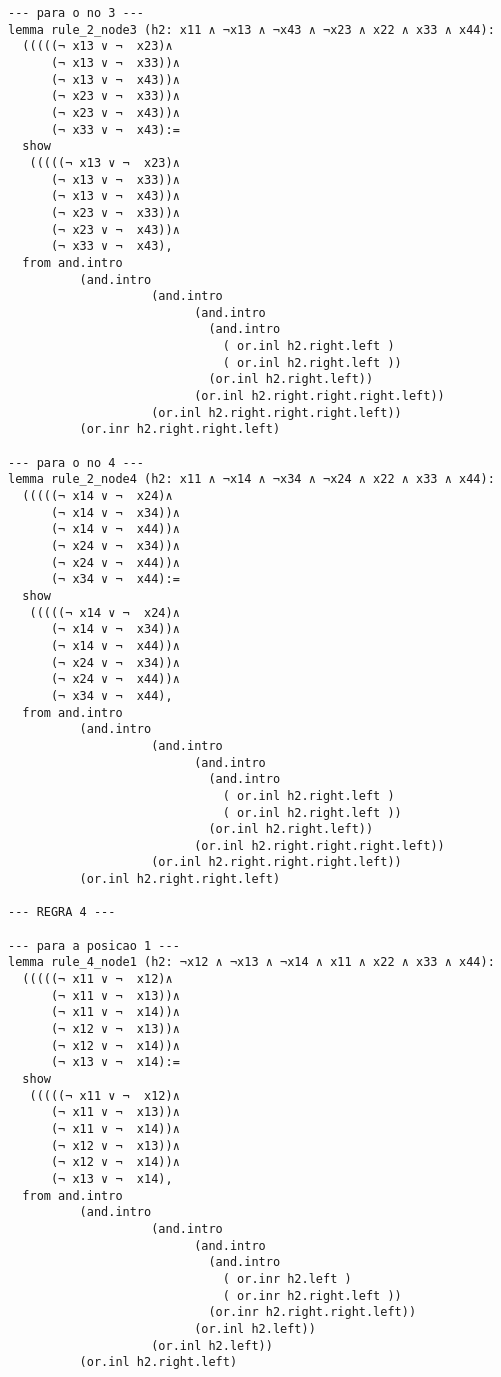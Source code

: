 \begin{enumerate}
\begin{lstlisting}
--- para o no 3 ---
lemma rule_2_node3 (h2: x11 ∧ ¬x13 ∧ ¬x43 ∧ ¬x23 ∧ x22 ∧ x33 ∧ x44):
  (((((¬ x13 ∨ ¬  x23)∧
      (¬ x13 ∨ ¬  x33))∧ 
      (¬ x13 ∨ ¬  x43))∧ 
      (¬ x23 ∨ ¬  x33))∧ 
      (¬ x23 ∨ ¬  x43))∧ 
      (¬ x33 ∨ ¬  x43):=
  show
   (((((¬ x13 ∨ ¬  x23)∧
      (¬ x13 ∨ ¬  x33))∧ 
      (¬ x13 ∨ ¬  x43))∧ 
      (¬ x23 ∨ ¬  x33))∧ 
      (¬ x23 ∨ ¬  x43))∧ 
      (¬ x33 ∨ ¬  x43),
  from and.intro
          (and.intro
                    (and.intro
                          (and.intro
                            (and.intro
                              ( or.inl h2.right.left ) 
                              ( or.inl h2.right.left ))
                            (or.inl h2.right.left))
                          (or.inl h2.right.right.right.left))
                    (or.inl h2.right.right.right.left))
          (or.inr h2.right.right.left)

--- para o no 4 ---
lemma rule_2_node4 (h2: x11 ∧ ¬x14 ∧ ¬x34 ∧ ¬x24 ∧ x22 ∧ x33 ∧ x44):
  (((((¬ x14 ∨ ¬  x24)∧
      (¬ x14 ∨ ¬  x34))∧ 
      (¬ x14 ∨ ¬  x44))∧ 
      (¬ x24 ∨ ¬  x34))∧ 
      (¬ x24 ∨ ¬  x44))∧ 
      (¬ x34 ∨ ¬  x44):=
  show
   (((((¬ x14 ∨ ¬  x24)∧
      (¬ x14 ∨ ¬  x34))∧ 
      (¬ x14 ∨ ¬  x44))∧ 
      (¬ x24 ∨ ¬  x34))∧ 
      (¬ x24 ∨ ¬  x44))∧ 
      (¬ x34 ∨ ¬  x44),
  from and.intro
          (and.intro
                    (and.intro
                          (and.intro
                            (and.intro
                              ( or.inl h2.right.left ) 
                              ( or.inl h2.right.left ))
                            (or.inl h2.right.left))
                          (or.inl h2.right.right.right.left))
                    (or.inl h2.right.right.right.left))
          (or.inl h2.right.right.left)

--- REGRA 4 ---

--- para a posicao 1 ---
lemma rule_4_node1 (h2: ¬x12 ∧ ¬x13 ∧ ¬x14 ∧ x11 ∧ x22 ∧ x33 ∧ x44):
  (((((¬ x11 ∨ ¬  x12)∧
      (¬ x11 ∨ ¬  x13))∧ 
      (¬ x11 ∨ ¬  x14))∧ 
      (¬ x12 ∨ ¬  x13))∧ 
      (¬ x12 ∨ ¬  x14))∧ 
      (¬ x13 ∨ ¬  x14):=
  show
   (((((¬ x11 ∨ ¬  x12)∧
      (¬ x11 ∨ ¬  x13))∧ 
      (¬ x11 ∨ ¬  x14))∧ 
      (¬ x12 ∨ ¬  x13))∧ 
      (¬ x12 ∨ ¬  x14))∧ 
      (¬ x13 ∨ ¬  x14),
  from and.intro
          (and.intro
                    (and.intro
                          (and.intro
                            (and.intro
                              ( or.inr h2.left ) 
                              ( or.inr h2.right.left ))
                            (or.inr h2.right.right.left))
                          (or.inl h2.left))
                    (or.inl h2.left))
          (or.inl h2.right.left)


\end{lstlisting}
\end{enumerate}
